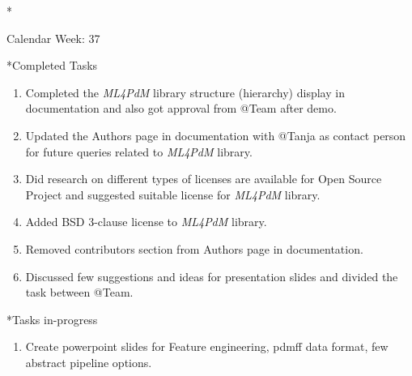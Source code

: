 \documentclass[11pt,a4paper]{article}
\begin{document}
\newpage
\begin{section}*{Calendar Week: 37 \hfill \date{17 September, 2021}}
 \begin{subsection}*{Completed Tasks}
     \begin{enumerate}
         \item Completed the \textit{ML4PdM} library structure (hierarchy) display in documentation and also got approval from @Team after demo.
         \item Updated the Authors page in documentation with @Tanja as contact person for future queries related to \textit{ML4PdM} library.
         \item Did research on different types of licenses are available for Open Source Project and suggested suitable license for \textit{ML4PdM} library.
         \item Added BSD 3-clause license to \textit{ML4PdM} library.
         \item Removed contributors section from Authors page in documentation.
         \item Discussed few suggestions and ideas for presentation slides and divided the task between @Team.
     \end{enumerate}
 \end{subsection}
 \begin{subsection}*{Tasks in-progress}
     \begin{enumerate}
         \item Create powerpoint slides for Feature engineering, pdmff data format, few abstract pipeline options.
     \end{enumerate}
 \end{subsection}
\end{section}
\end{document}
